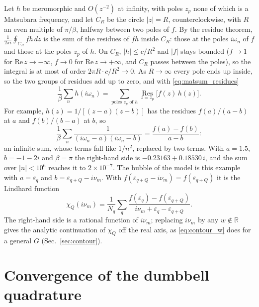 \documentclass[aps,prb,reprint,a4paper]{revtex4-2}
\newcommand{\Res}{\operatorname*{Res}}
\begin{document}
Let $h$ be meromorphic and $O(z^{-2})$ at infinity, with poles $z_p$ none of which is a Matsubara frequency, and let $C_R$ be the circle $\lvert z\rvert=R$, counterclockwise, with $R$ an even multiple of $\pi/\beta$, halfway between two poles of $f$. By the residue theorem, $\frac1{2\pi i}\oint_{C_R}fh\,dz$ is the sum of the residues of $fh$ inside $C_R$: those at the poles $i\omega_n$ of $f$ and those at the poles $z_p$ of $h$. On $C_R$, $\lvert h\rvert\le c/R^2$ and $\lvert f\rvert$ stays bounded ($f\to1$ for $\mathrm{Re}\,z\to-\infty$, $f\to0$ for $\mathrm{Re}\,z\to+\infty$, and $C_R$ passes between the poles), so the integral is at most of order $2\pi R\cdot c/R^2\to0$. As $R\to\infty$ every pole ends up inside, so the two groups of residues add up to zero, and with \eqref{eq:matsum_residues}
\begin{equation}
  \frac1\beta\sum_nh(i\omega_n)=\sum_{\text{poles }z_p\text{ of }h}\Res_{z=z_p}\big[f(z)\,h(z)\big].
  \label{eq:residues_h}
\end{equation}
For example, $h(z)=1/[(z-a)(z-b)]$ has the residues $f(a)/(a-b)$ at $a$ and $f(b)/(b-a)$ at $b$, so
\begin{equation}
  \frac1\beta\sum_n\frac1{(i\omega_n-a)(i\omega_n-b)}=\frac{f(a)-f(b)}{a-b} :
  \label{eq:two_poles}
\end{equation}
an infinite sum, whose terms fall like $1/n^2$, replaced by two terms. With $a=1.5$, $b=-1-2i$ and $\beta=\pi$ the right-hand side is $-0.23163+0.18530\,i$, and the sum over $\lvert n\rvert<10^6$ reaches it to $2\times10^{-7}$. The bubble of the model is this example with $a=\varepsilon_q$ and $b=\varepsilon_{q+Q}-i\nu_m$. With $f(\varepsilon_{q+Q}-i\nu_m)=f(\varepsilon_{q+Q})$ it is the Lindhard function
\begin{equation}
  \chi_Q(i\nu_m)=\frac1{N_q}\sum_q\frac{f(\varepsilon_q)-f(\varepsilon_{q+Q})}{i\nu_m+\varepsilon_q-\varepsilon_{q+Q}} .
  \label{eq:lindhard}
\end{equation}
The right-hand side is a rational function of $i\nu_m$; replacing $i\nu_m$ by any $w\notin\mathbb R$ gives the analytic continuation of $\chi_Q$ off the real axis, as \eqref{eq:contour_w} does for a general $G$ (Sec.~\ref{sec:contour}).

\section{Convergence of the dumbbell quadrature}
\label{app:trap}
\end{document}

